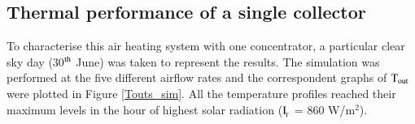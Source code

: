 





%		

\subsection{Thermal performance of a single collector}

To characterise this air heating system with one concentrator, a particular clear sky day (30$^{\rm{th}}$ June) was taken to represent the results. The simulation was performed at the five different airflow rates and the correspondent graphs of $\rm{T_{out}}$ were plotted in Figure \ref{Touts_sim}. All the temperature profiles reached their maximum levels in the hour of highest solar radiation ($\rm{I_{\!_T}}$ = 860 W/m$^2$). 


